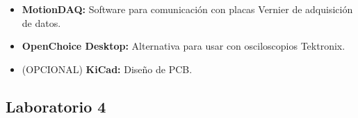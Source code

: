 \begin{itemize}
\begin{itemize}
        \item \textbf{NI MAX:} Software para configurar y administrar instrumentos de medición.
        \item \textbf{NI-DAQmx:} Librería para comunicación con las placas de adquisición de NI y Vernier.
    \end{itemize}
    \item \textbf{MotionDAQ:} Software para comunicación con placas Vernier de adquisición de datos.
    \item \textbf{OpenChoice Desktop:} Alternativa para usar con osciloscopios Tektronix.
    \item (OPCIONAL) \textbf{KiCad:} Diseño de PCB.
\end{itemize}

\subsection{Laboratorio 4}
